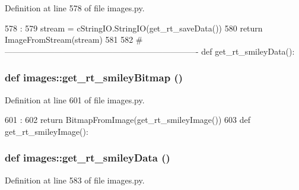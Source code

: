 Definition at line 578 of file images.py.


\begin{DoxyCode}
578                       :
579     stream = cStringIO.StringIO(get_rt_saveData())
580     return ImageFromStream(stream)
581 
582 #----------------------------------------------------------------------
def get_rt_smileyData():
\end{DoxyCode}
\hypertarget{namespaceimages_a975b8b30ea22830594154441c1bd002a}{
\subsubsection[{get\_\-rt\_\-smileyBitmap}]{\setlength{\rightskip}{0pt plus 5cm}def images::get\_\-rt\_\-smileyBitmap ()}}
\label{namespaceimages_a975b8b30ea22830594154441c1bd002a}


Definition at line 601 of file images.py.


\begin{DoxyCode}
601                          :
602     return BitmapFromImage(get_rt_smileyImage())
603 
def get_rt_smileyImage():
\end{DoxyCode}
\hypertarget{namespaceimages_ae81a68479b537fb735d51668c65ac126}{
\subsubsection[{get\_\-rt\_\-smileyData}]{\setlength{\rightskip}{0pt plus 5cm}def images::get\_\-rt\_\-smileyData ()}}
\label{namespaceimages_ae81a68479b537fb735d51668c65ac126}


Definition at line 583 of file images.py.


